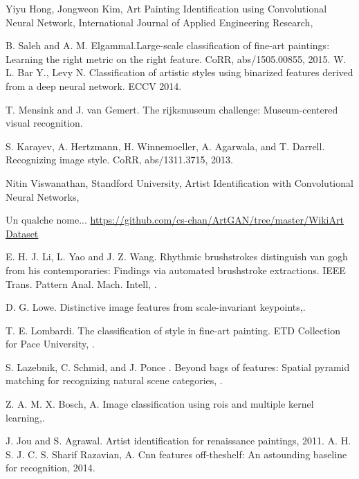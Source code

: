 \documentclass{article}
\begin{document}
\begin{thebibliography}{1}
	
	Yiyu Hong, Jongweon Kim, \newblock  Art Painting Identification using Convolutional Neural Network, \newblock International Journal of Applied Engineering Research, 
	
	B. Saleh and A. M. Elgammal.\newblock  Large-scale classification
	of fine-art paintings: Learning the right metric on the right
	feature. \newblock CoRR, abs/1505.00855, 2015.
	W. L. Bar Y., Levy N. Classification of artistic styles using binarized features derived from a deep neural network.
	ECCV 2014.
	
	T. Mensink and J. van Gemert. \newblock The rijksmuseum challenge:
	Museum-centered visual recognition. 
	
	S. Karayev, A. Hertzmann, H. Winnemoeller, A. Agarwala, and T. Darrell. Recognizing image style. CoRR,
	abs/1311.3715, 2013.
	
	Nitin Viswanathan, Standford University,
	\newblock Artist Identification with Convolutional Neural Networks, 
	
	Un qualche nome... \newblock
	\url{https://github.com/cs-chan/ArtGAN/tree/master/WikiArt Dataset}
	
	E. H. J. Li, L. Yao and J. Z. Wang. \newblock Rhythmic brushstrokes
	distinguish van gogh from his contemporaries: Findings via
	automated brushstroke extractions. IEEE Trans. Pattern
	Anal. Mach. Intell, .
	
	D. G. Lowe. \newblock Distinctive image features from scale-invariant
	keypoints,.
	
	T. E. Lombardi. \newblock The classification of style in fine-art painting. ETD Collection for Pace University, .
	
	S. Lazebnik, C. Schmid, and J. Ponce \newblock. Beyond bags of
	features: Spatial pyramid matching for recognizing natural
	scene categories, .
	
	Z. A. M. X. Bosch, A. \newblock Image classification using rois and
	multiple kernel learning,.
	
	J. Jou and S. Agrawal. Artist identification for renaissance
	paintings, 2011.
	A. H. S. J. C. S. Sharif Razavian, A. Cnn features off-theshelf: An astounding baseline for recognition, 2014.
	

\end{thebibliography}
\end{document}
